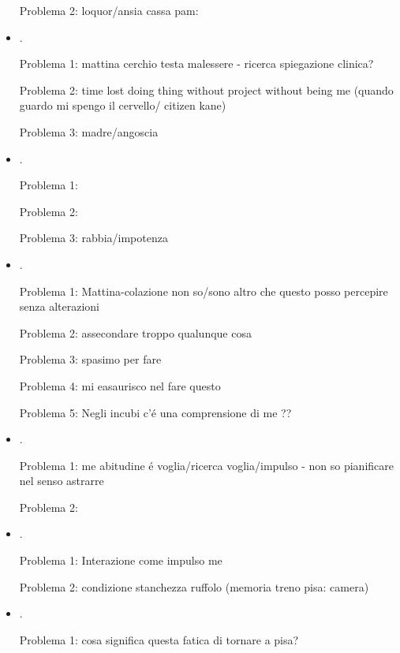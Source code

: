 \begin{itemize}
Problema 2: loquor/ansia cassa pam: 


\item {}.

Problema 1: mattina cerchio testa malessere - ricerca spiegazione clinica?

Problema 2: time lost doing thing without project without being me (quando guardo mi spengo il cervello/ citizen kane)

Problema 3: madre/angoscia


\item {}.

Problema 1: 

Problema 2: 

Problema 3: rabbia/impotenza


\item {}.

Problema 1: Mattina-colazione non so/sono altro che questo posso percepire  senza alterazioni

Problema 2: assecondare troppo qualunque cosa

Problema 3: spasimo per fare

Problema 4: mi easaurisco nel fare questo

Problema 5: Negli incubi c'\'e una comprensione di me ??


\item {}.

Problema 1: me abitudine \'e voglia/ricerca voglia/impulso - non so pianificare nel senso astrarre

Problema 2:

\item {}.

Problema 1: Interazione come impulso me

Problema 2: condizione stanchezza ruffolo (memoria treno pisa: camera)

\item {}.

Problema 1: cosa significa questa fatica di tornare a pisa? 


\end{itemize}
